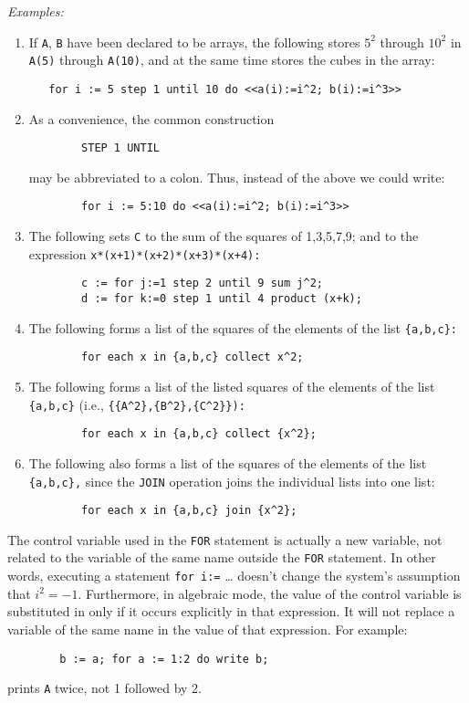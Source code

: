 \textit{Examples:}
\begin{enumerate}
\item If \texttt{A}, \texttt{B} have been declared to be arrays, the following
stores $5^{2}$ through $10^{2}$ in \texttt{A(5)} through \texttt{A(10)}, and at
the same time stores the cubes in the  array:
\begin{verbatim}
   for i := 5 step 1 until 10 do <<a(i):=i^2; b(i):=i^3>>
\end{verbatim}
\item As a convenience, the common construction
\begin{verbatim}
        STEP 1 UNTIL
\end{verbatim}
may be abbreviated to a colon. Thus, instead of the above we could write:
\begin{verbatim}
        for i := 5:10 do <<a(i):=i^2; b(i):=i^3>>
\end{verbatim}
\item The following sets \texttt{C} to the sum of the squares of 1,3,5,7,9;
and  to the expression \texttt{x*(x+1)*(x+2)*(x+3)*(x+4):}
\begin{verbatim}
        c := for j:=1 step 2 until 9 sum j^2;
        d := for k:=0 step 1 until 4 product (x+k);
\end{verbatim}
\item The following forms a list of the squares of the elements of the list
\texttt{\{a,b,c\}:}
\begin{verbatim}
        for each x in {a,b,c} collect x^2;
\end{verbatim}
\item The following forms a list of the listed squares of the elements of the
list \texttt{\{a,b,c\}}
(i.e., \texttt{\{\{A\textasciicircum 2\},\{B\textasciicircum 2\},\{C\textasciicircum 2\}\}):}
\begin{verbatim}
        for each x in {a,b,c} collect {x^2};
\end{verbatim}
\item The following also forms a list of the squares of the elements of
the list \texttt{\{a,b,c\},} since the \texttt{JOIN} operation joins the
individual lists into one list:
\begin{verbatim}
        for each x in {a,b,c} join {x^2};
\end{verbatim}
\end{enumerate}
The control variable used in the \texttt{FOR} statement is actually a new
variable, not related to the variable of the same name outside the 
\texttt{FOR} statement.  In other words, executing a statement 
\texttt{for i:=} \ldots
doesn't change the system's assumption that $i^{2} = -1$.
Furthermore, in algebraic mode, the value of the control variable is
substituted in  only if it occurs explicitly in that
expression.  It will not replace a variable of the same name in the value
of that expression.  For example:
\begin{verbatim}
        b := a; for a := 1:2 do write b;
\end{verbatim}
prints \texttt{A} twice, not 1 followed by 2.

